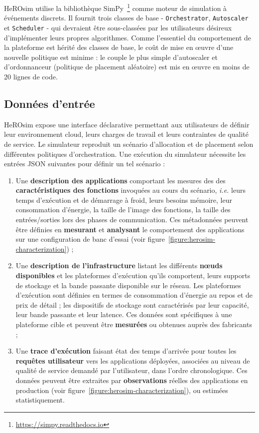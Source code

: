 HeROsim utilise la bibliothèque SimPy~\footnote{\href{https://simpy.readthedocs.io}{https://simpy.readthedocs.io}} comme moteur de simulation à événements discrets. Il fournit trois classes de base - \texttt{Orchestrator}, \texttt{Autoscaler} et \texttt{Scheduler} - qui devraient être sous-classées par les utilisateurs désireux d'implémenter leurs propres algorithmes. Comme l'essentiel du comportement de la plateforme est hérité des classes de base, le coût de mise en œuvre d'une nouvelle politique est minime : le couple le plus simple d'autoscaler et d'ordonnanceur (politique de placement aléatoire) est mis en œuvre en moins de 20 lignes de code.

\subsection{Données d'entrée}

HeROsim expose une interface déclarative permettant aux utilisateurs de définir leur environnement cloud, leurs charges de travail et leurs contraintes de qualité de service. Le simulateur reproduit un scénario d'allocation et de placement selon différentes politiques d'orchestration. Une exécution du simulateur nécessite les entrées JSON suivantes pour définir un tel scénario :

\begin{enumerate}
    \item Une \textbf{description des applications} comportant les mesures des des \textbf{caractéristiques des fonctions} invoquées au cours du scénario, \textit{i.e.} leurs temps d'exécution et de démarrage à froid, leurs besoins mémoire, leur consommation d'énergie, la taille de l'image des fonctions, la taille des entrées/sorties lors des phases de communication. Ces métadonnées peuvent être définies en \textbf{mesurant} et \textbf{analysant} le comportement des applications sur une configuration de banc d'essai (voir figure~\ref{figure:herosim-characterization}) ;
    \item Une \textbf{description de l'infrastructure} listant les différents \textbf{nœuds disponibles} et les plateformes d'exécution qu'ils comportent, leurs supports de stockage et la bande passante disponible sur le réseau. Les plateformes d'exécution sont définies en termes de consommation d'énergie au repos et de prix de détail ; les dispositifs de stockage sont caractérisés par leur capacité, leur bande passante et leur latence. Ces données sont spécifiques à une plateforme cible et peuvent être \textbf{mesurées} ou obtenues auprès des fabricants ;
    \item Une \textbf{trace d'exécution} faisant état des temps d'arrivée pour toutes les \textbf{requêtes utilisateur} vers les applications déployées, associées au niveau de qualité de service demandé par l'utilisateur, dans l'ordre chronologique. Ces données peuvent être extraites par \textbf{observations} réelles des applications en production (voir figure~\ref{figure:herosim-characterization}), ou estimées statistiquement.
\end{enumerate}

